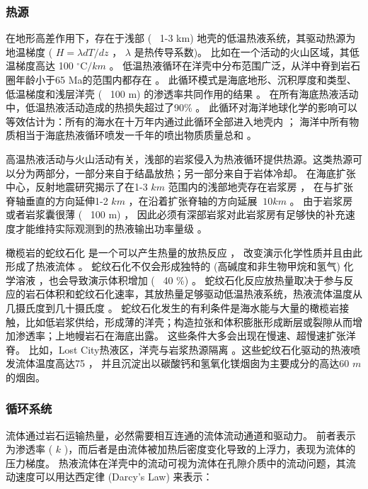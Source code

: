 \subsubsection{热源}  %
在地形高差作用下，存在于浅部 (~ 1-3 km) 地壳的低温热液系统，其驱动热源为地温梯度 ( $ H=\lambda dT/dz $ ， $ \lambda $ 是热传导系数)。
比如在一个活动的火山区域，其低温梯度高达 100  $ ^{\circ} \text{C} /km $   \citep{LOWELL2014} 。
低温热液循环在洋壳中分布范围广泛，从洋中脊到岩石圈年龄小于65 Ma的范围内都存在 \citep{stein1994constraints} 。
此循环模式是海底地形、沉积厚度和类型、低温梯度和浅层洋壳 (~ 100 m) 的渗透率共同作用的结果  \citep{lowell1980topographically} 。
在所有海底热液活动中，低温热液活动造成的热损失超过了90\%  \citep{elderfield1996mid} 。
此循环对海洋地球化学的影响可以等效估计为：所有的海水在十万年内通过此循环全部进入地壳内 \citep{elderfield1996mid} ；
海洋中所有物质相当于海底热液循环喷发一千年的喷出物质质量总和 \citep{kadko1995magnitude} 。

高温热液活动与火山活动有关，浅部的岩浆侵入为热液循环提供热源。这类热源可以分为两部分，一部分来自于结晶放热；另一部分来自于岩体冷却。
在海底扩张中心，反射地震研究揭示了在1-3  $ km $ 范围内的浅部地壳存在岩浆房 \cite{carbotte2008variable,singh2006discovery} ，
在与扩张脊轴垂直的方向延伸1-2  $ km $ ，在沿着扩张脊轴的方向延展  $ ~ 10 km $  \citep{van2007seismic,jacobs2007axial} 。
由于岩浆房或者岩浆囊很薄 (~ 100 m) \citep{kent1990evidence,LOWELL2014}  ，
因此必须有深部岩浆对此岩浆房有足够快的补充速度才能维持实际观测到的热液输出功率量级 \citep{liu2009models} 。

橄榄岩的蛇纹石化 是一个可以产生热量的放热反应 \cite{macdonald1985rate} ，
改变演示化学性质并且由此形成了热液流体 \citep{janecky1986hydrothermal,wetzel2000distinguishing} 。
蛇纹石化不仅会形成独特的 (高碱度和非生物甲烷和氢气) 化学溶液 \citep{seyfried2004ultramafic} ，也会导致演示体积增加 (~ 40 \%) \citep{coleman1971petrologic,o1992solution} 。
蛇纹石化反应放热量取决于参与反应的岩石体积和蛇纹石化速率，其放热量足够驱动低温热液系统，热液流体温度从几摄氏度到几十摄氏度 \citep{lowell2002seafloor} 。
蛇纹石化发生的有利条件是海水能与大量的橄榄岩接触，比如低岩浆供给，形成薄的洋壳；构造拉张和体积膨胀形成断层或裂隙从而增加渗透率；上地幔岩石在海底出露。
这些条件大多会出现在慢速、超慢速扩张洋脊。
比如，Lost City热液区，洋壳与岩浆热源隔离  \citep{kelley2001off} 。这些蛇纹石化驱动的热液喷发流体温度高达75 \ssd，
并且沉淀出以碳酸钙和氢氧化镁烟囱为主要成分的高达60  $ m $  的烟囱。


\subsubsection{循环系统}  %
流体通过岩石运输热量，必然需要相互连通的流体流动通道和驱动力。
前者表示为渗透率 ( $ k $ )，而后者是由流体被加热后密度变化导致的上浮力，表现为流体的压力梯度。
热液流体在洋壳中的流动可视为流体在孔隙介质中的流动问题，其流动速度可以用达西定律 (Darcy's Law) 来表示：

